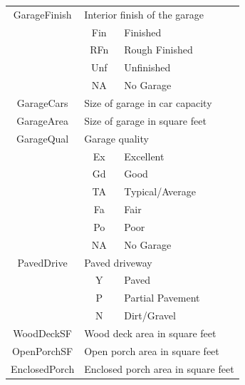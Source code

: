 \documentclass[11pt]{scrartcl} %
\begin{document}
\begin{center}
\begin{tabular}{c c c c c c}
\hline
\multicolumn{2}{|c}{GarageFinish} & \multicolumn{4}{l|}{Interior finish of the garage}\\ 
\multicolumn{2}{|c}{} & \multicolumn{1}{c}{Fin} & \multicolumn{3}{l|}{Finished}\\
\multicolumn{2}{|c}{} & \multicolumn{1}{c}{RFn} & \multicolumn{3}{l|}{Rough Finished}\\
\multicolumn{2}{|c}{} & \multicolumn{1}{c}{Unf} & \multicolumn{3}{l|}{Unfinished}\\
\multicolumn{2}{|c}{} & \multicolumn{1}{c}{NA} & \multicolumn{3}{l|}{No Garage}\\
\hline
\multicolumn{2}{|c}{GarageCars} & \multicolumn{4}{l|}{Size of garage in car capacity}\\
\hline
\multicolumn{2}{|c}{GarageArea} & \multicolumn{4}{l|}{Size of garage in square feet}\\
\hline
\multicolumn{2}{|c}{GarageQual} & \multicolumn{4}{l|}{Garage quality}\\ 
\multicolumn{2}{|c}{} & \multicolumn{1}{c}{Ex} & \multicolumn{3}{l|}{Excellent}\\
\multicolumn{2}{|c}{} & \multicolumn{1}{c}{Gd} & \multicolumn{3}{l|}{Good}\\
\multicolumn{2}{|c}{} & \multicolumn{1}{c}{TA} & \multicolumn{3}{l|}{Typical/Average}\\
\multicolumn{2}{|c}{} & \multicolumn{1}{c}{Fa} & \multicolumn{3}{l|}{Fair}\\
\multicolumn{2}{|c}{} & \multicolumn{1}{c}{Po} & \multicolumn{3}{l|}{Poor}\\
\multicolumn{2}{|c}{} & \multicolumn{1}{c}{NA} & \multicolumn{3}{l|}{No Garage}\\
\hline
\multicolumn{2}{|c}{PavedDrive} & \multicolumn{4}{l|}{Paved driveway}\\ 
\multicolumn{2}{|c}{} & \multicolumn{1}{c}{Y} & \multicolumn{3}{l|}{Paved}\\
\multicolumn{2}{|c}{} & \multicolumn{1}{c}{P} & \multicolumn{3}{l|}{Partial Pavement}\\
\multicolumn{2}{|c}{} & \multicolumn{1}{c}{N} & \multicolumn{3}{l|}{Dirt/Gravel}\\
\hline
\multicolumn{2}{|c}{WoodDeckSF} & \multicolumn{4}{l|}{Wood deck area in square feet}\\
\hline
\multicolumn{2}{|c}{OpenPorchSF} & \multicolumn{4}{l|}{Open porch area in square feet}\\
\hline
\multicolumn{2}{|c}{EnclosedPorch} & \multicolumn{4}{l|}{Enclosed porch area in square feet}\\

\end{tabular}
\end{center}
\end{document}
